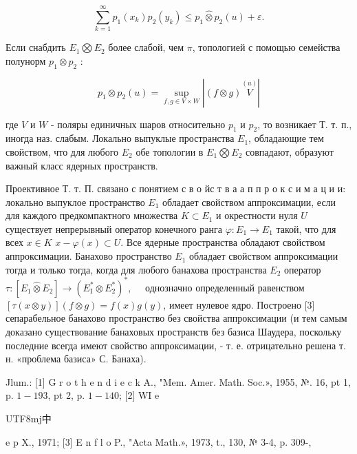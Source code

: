 \documentclass[10pt]{article}
\begin{document}
\[

\sum_{k=1}^{\infty} p_{1}\left(x_{k}\right) p_{2}\left(y_{k}\right) \leqslant p_{1} \hat{\otimes} p_{2}(u)+\varepsilon .

\]



Если снабдить $E_{1} \bigotimes E_{2}$ более слабой, чем $\pi$, топологией с помощью семейства полунорм $p_{1} \otimes p_{2}$ :



\[

p_{1} \otimes p_{2}(u)=\sup _{f, g \in V \times W}|(f \otimes g) \stackrel{(u)}{V}|

\]



где $V$ и $W$ - поляры единичных шаров относительно $p_{1}$ и $p_{2}$, то возникает Т. т. п., иногда наз. слабым. Локально выпуклые пространства $E_{1}$, обладающие тем свойством, что для любого $E_{2}$ обе топологии в $E_{1} \bigotimes E_{2}$ совпадают, образуют важный класс ядерных пространств.



Проективное Т. т. П. связано с понятием с в о йс т в а а п п р о к с и м а ц и и: локально выпуклое пространство $E_{1}$ обладает свойством аппроксимации, если для каждого предкомпактного множества $K \subset E_{1}$ и окрестности нуля $U$ существует непрерывный оператор конечного ранга $\varphi: E_{1} \rightarrow E_{1}$ такой, что для всех $x \in K$ $x-\varphi(x) \subset U$. Все ядерные пространства обладают свойством аппроксимации. Банахово пространство $E_{1}$ обладает свойством аппроксимации тогда и только тогда, когда для любого банахова пространства $E_{2}$ оператор $\tau:\left[E_{1} \widehat{\otimes} E_{2}\right] \rightarrow\left(E_{\mathrm{I}}^{*} \otimes E_{2}^{*}\right)^{*}, \quad$ однозначно определенный равенством $[\tau(x \otimes y)](f \otimes g)=f(x) g(y)$, имеет нулевое ядро. Построено [3] сепарабельное банахово пространство без свойства аппроксимации (и тем самым доказано существование банаховых пространств без базиса Шаудера, поскольку последние всегда имеют свойство аппроксимации, - т. е. отрицательно решена т. н. «проблема базиса» С. Банаха).



Jlum.: [1] G r o t h e n d i e c k A., "Mem. Amer. Math. Soc.», 1955, №. 16, pt 1, p. $1-193$, pt 2, p. $1-140$; [2] WI e \begin{CJK}{UTF8}{mj}中\end{CJK} e p X., 1971; [3] E n f l o P., "Acta Math.», 1973, t., 130, № 3-4, p. 309-,
\end{document}
